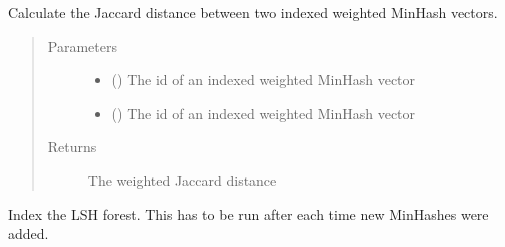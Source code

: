 \documentclass[letterpaper,10pt,english]{sphinxmanual}
\begin{document}
\begin{fulllineitems}
\begin{fulllineitems}
\begin{quote}
\begin{description}
\end{description}\end{quote}

\end{fulllineitems}


\begin{fulllineitems}
\label{\detokenize{documentation:tmap.LSHForest.get_weighted_distance_by_id}}
Calculate the Jaccard distance between two indexed weighted MinHash vectors.
\begin{quote}\begin{description}
\item[{Parameters}] \leavevmode\begin{itemize}
\item {} 
 () \textendash{} The id of an indexed weighted MinHash vector

\item {} 
 () \textendash{} The id of an indexed weighted MinHash vector

\end{itemize}

\item[{Returns}] \leavevmode
{} The weighted Jaccard distance

\end{description}\end{quote}

\end{fulllineitems}


\begin{fulllineitems}
\label{\detokenize{documentation:tmap.LSHForest.index}}
Index the LSH forest. This has to be run after each time new MinHashes were added.

\end{fulllineitems}


\end{fulllineitems}
\end{document}
